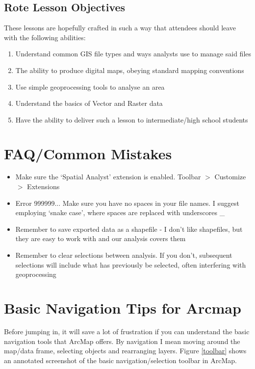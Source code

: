 \documentclass{article}
\begin{document}
\subsection{Rote Lesson Objectives}
These lessons are hopefully crafted in such a way that attendees should leave with the following abilities:
\begin{enumerate}
	\item Understand common GIS file types and ways analysts use to manage said files
	\item The ability to produce digital maps, obeying standard mapping conventions
	\item Use simple geoprocessing tools to analyse an area
	\item Understand the basics of Vector and Raster data
	\item Have the ability to deliver such a lesson to intermediate/high school students
\end{enumerate}

\section{FAQ/Common Mistakes}
\begin{itemize}
    \item Make sure the `Spatial Analyst' extension is enabled. Toolbar $>$ Customize $>$ Extensions
    \item Error 999999... Make sure you have no spaces in your file names. I suggest employing `snake case', where spaces are replaced with underscores \_
    \item Remember to save exported data as a shapefile - I don't like shapefiles, but they are easy to work with and our analysis covers them
    \item Remember to clear selections between analysis. If you don't, subsequent selections will include what has previously be selected, often interfering with geoprocessing
\end{itemize}
\pagebreak

\section{Basic Navigation Tips for Arcmap}
Before jumping in, it will save a lot of frustration if you can understand the basic navigation tools that ArcMap offers. By navigation I mean moving around the map/data frame, selecting objects and rearranging layers. Figure \ref{toolbar} shows an annotated screenshot of the basic navigation/selection toolbar in ArcMap. 
\end{document}
